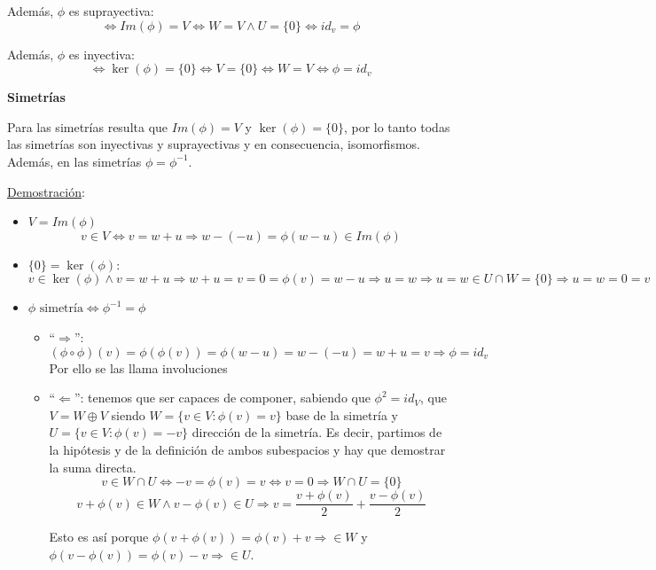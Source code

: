 \documentclass[10pt,a4paper,openright]{book}
\theoremstyle{break}
\begin{document}
Además, $\phi$ es suprayectiva:
$$\Leftrightarrow Im(\phi)=V\Leftrightarrow W=V \wedge U=\{0\}\Leftrightarrow id_v=\phi$$

Además, $\phi$ es inyectiva:
$$\Leftrightarrow \ker(\phi)=\{0\}\Leftrightarrow V=\{0\}\Leftrightarrow W=V\Leftrightarrow \phi=id_v$$

\textbf{Simetrías}\par

Para las simetrías resulta que $Im(\phi)=V$ y $\ker(\phi)=\{0\}$, por lo tanto todas las simetrías son inyectivas y suprayectivas y en consecuencia, isomorfismos. Además, en las simetrías $\phi=\phi^{-1}$.\par

\underline{Demostración}:
\begin{itemize}
\item $V=Im(\phi)$
$$v\in V\Leftrightarrow v=w+u \Rightarrow w-(-u)=\phi(w-u)\in Im(\phi)$$

\item $\{0\}=\ker(\phi)$:
$$v\in \ker(\phi)\wedge v=w+u\Rightarrow w+u=v=0=\phi(v)=w-u\Rightarrow u=w\Rightarrow u=w\in U\cap W=\{0\}\Rightarrow u=w=0=v$$

\item $\phi \mbox{ simetría}\Leftrightarrow \phi^{-1}=\phi$
\begin{itemize}
\item ``$\Rightarrow$'':
$$(\phi \circ \phi)(v)=\phi(\phi (v))=\phi(w-u)=w-(-u)=w+u=v\Rightarrow \phi=id_v$$
Por ello se las llama involuciones

\item ``$\Leftarrow$'': tenemos que ser capaces de componer, sabiendo que $\phi^2=id_V$, que $V=W\oplus V$ siendo $W=\{v\in V: \phi(v)=v\}$ base de la simetría y $U=\{v\in V: \phi(v)=-v\}$ dirección de la simetría. Es decir, partimos de la hipótesis y de la definición de ambos subespacios y hay que demostrar la suma directa.
$$v\in W\cap U\Leftrightarrow -v=\phi(v)=v\Leftrightarrow v=0\Rightarrow W\cap U=\{0\}$$
$$v+\phi(v)\in W\wedge v-\phi(v)\in U\Rightarrow v=\frac{v+\phi(v)}{2}+\frac{v-\phi(v)}{2}$$

Esto es así porque $\phi(v+\phi(v))=\phi(v)+v\Rightarrow \in W$ y $\phi(v-\phi(v))=\phi(v)-v\Rightarrow \in U$.


\end{itemize}
\end{itemize}
\end{document}
